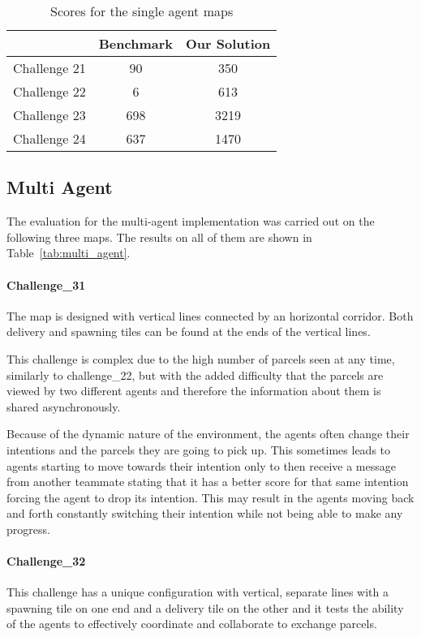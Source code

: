 \begin{table}
    \centering
    \begin{tabular}{c || c c} \hline
                     & Benchmark & Our Solution \\ \hline
        Challenge 21 & 90        & 350          \\
        Challenge 22 & 6         & 613          \\
        Challenge 23 & 698       & 3219         \\
        Challenge 24 & 637       & 1470         \\  \hline
    \end{tabular}
    \caption{Scores for the single agent maps}
    \label{tab:single_agent}
\end{table}


\subsection{Multi Agent}
The evaluation for the multi-agent implementation was carried out on the following three maps. The results on all of them are shown in Table~\ref{tab:multi_agent}.


\paragraph{Challenge\_31} The map is designed with vertical lines connected by an horizontal corridor. Both delivery and spawning tiles can be found at the ends of the vertical lines.

This challenge is complex due to the high number of parcels seen at any time, similarly to challenge\_22, but with the added difficulty that the parcels are viewed by two different agents and therefore the information about them is shared asynchronously.

Because of the dynamic nature of the environment, the agents often change their intentions and the parcels they are going to pick up. This sometimes leads to agents starting to move towards their intention only to then receive a message from another teammate stating that it has a better score for that same intention forcing the agent to drop its intention. This may result in the agents moving back and forth constantly switching their intention while not being able to make any progress.

\paragraph{Challenge\_32}  This challenge has a unique configuration with vertical, separate lines with a spawning tile on one end and a delivery tile on the other and it tests the ability of the agents to effectively coordinate and collaborate to exchange parcels.

